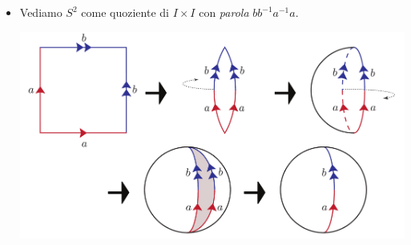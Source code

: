 \begin{examples}
\begin{itemize}
\begin{center}
		\end{center}
		\item Vediamo $S^2$ come quoziente di $I\times I$ con \textit{parola} $bb^{-1}a^{-1}a$.
		\begin{center}
			\includegraphics[trim=0cm 0cm 0cm 0cm, clip, scale=0.375]{images/sphere.pdf}
		\end{center}
	\end{itemize}
\vspace{-6mm}
\end{examples}

